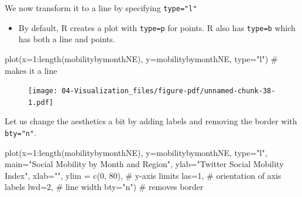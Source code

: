 \documentclass[
  letterpaper,
  DIV=11,
  numbers=noendperiod]{scrreprt}
\newenvironment{Shaded}{\begin{snugshade}}{\end{snugshade}}
\newcommand{\AttributeTok}[1]{\textcolor[rgb]{0.40,0.45,0.13}{#1}}
\newcommand{\CommentTok}[1]{\textcolor[rgb]{0.37,0.37,0.37}{#1}}
\newcommand{\DecValTok}[1]{\textcolor[rgb]{0.68,0.00,0.00}{#1}}
\newcommand{\FunctionTok}[1]{\textcolor[rgb]{0.28,0.35,0.67}{#1}}
\newcommand{\NormalTok}[1]{\textcolor[rgb]{0.00,0.23,0.31}{#1}}
\newcommand{\SpecialCharTok}[1]{\textcolor[rgb]{0.37,0.37,0.37}{#1}}
\newcommand{\StringTok}[1]{\textcolor[rgb]{0.13,0.47,0.30}{#1}}
\providecommand{\tightlist}{%
  \setlength{\itemsep}{0pt}\setlength{\parskip}{0pt}}\usepackage{longtable,booktabs,array}
\begin{document}
We now transform it to a line by specifying \texttt{type="l"}

\begin{itemize}
\tightlist
\item
  By default, R creates a plot with \texttt{type=p} for points. R also
  has \texttt{type=b} which has both a line and points.
\end{itemize}

\begin{Shaded}
\begin{Highlighting}[]
\FunctionTok{plot}\NormalTok{(}\AttributeTok{x=}\DecValTok{1}\SpecialCharTok{:}\FunctionTok{length}\NormalTok{(mobilitybymonthNE),}
     \AttributeTok{y=}\NormalTok{mobilitybymonthNE, }\AttributeTok{type=}\StringTok{"l"}\NormalTok{) }\CommentTok{\# makes it a line}
\end{Highlighting}
\end{Shaded}

\begin{figure}[H]

{\centering \texttt{[image: 04-Visualization\_files/figure-pdf/unnamed-chunk-38-1.pdf]}

}

\end{figure}

Let us change the aesthetics a bit by adding labels and removing the
border with \texttt{bty="n"}.

\begin{Shaded}
\begin{Highlighting}[]
\FunctionTok{plot}\NormalTok{(}\AttributeTok{x=}\DecValTok{1}\SpecialCharTok{:}\FunctionTok{length}\NormalTok{(mobilitybymonthNE),}
     \AttributeTok{y=}\NormalTok{mobilitybymonthNE,}
     \AttributeTok{type=}\StringTok{"l"}\NormalTok{, }
     \AttributeTok{main=}\StringTok{"Social Mobility by Month and Region"}\NormalTok{,}
     \AttributeTok{ylab=}\StringTok{"Twitter Social Mobility Index"}\NormalTok{,}
     \AttributeTok{xlab=}\StringTok{""}\NormalTok{,}
     \AttributeTok{ylim =} \FunctionTok{c}\NormalTok{(}\DecValTok{0}\NormalTok{, }\DecValTok{80}\NormalTok{), }\CommentTok{\# y{-}axis limits}
     \AttributeTok{las=}\DecValTok{1}\NormalTok{, }\CommentTok{\# orientation of axis labels}
     \AttributeTok{lwd=}\DecValTok{2}\NormalTok{, }\CommentTok{\# line width}
     \AttributeTok{bty=}\StringTok{"n"}\NormalTok{) }\CommentTok{\# removes border}
\end{Highlighting}
\end{Shaded}
\end{document}
